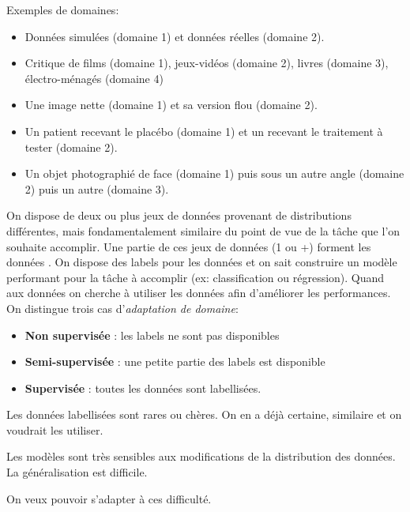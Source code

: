 Exemples de domaines:
\begin{itemize}
	\item Données simulées (domaine 1) et données réelles (domaine 2).
	\item Critique de films (domaine 1), jeux-vidéos (domaine 2), livres (domaine 3), électro-ménagés (domaine 4)
	\item Une image nette (domaine 1) et sa version flou (domaine 2).
	\item Un patient recevant le placébo (domaine 1) et un recevant le traitement à tester (domaine 2).
	\item Un objet photographié de face (domaine 1) puis sous un autre angle (domaine 2) puis un autre (domaine 3).
\end{itemize}

On dispose de deux ou plus jeux de données provenant de distributions différentes, mais fondamentalement
similaire du point de vue de la tâche que l'on souhaite accomplir.
Une partie de ces jeux de données (1 ou +) forment les données \sources{}. 
On dispose des labels pour les données \sources{} et on sait construire un modèle performant 
pour la tâche à accomplir (ex: classification ou régression).
Quand aux données \cibles{} on cherche à utiliser les données \sources{} afin d'améliorer les performances.
On distingue trois cas d'\emph{adaptation de domaine}:
\begin{itemize}
	\item \textbf{Non supervisée} : les labels \cibles{} ne sont pas disponibles
	\item \textbf{Semi-supervisée} : une petite partie des labels \cibles{} est disponible
	\item \textbf{Supervisée} : toutes les données \cibles{} sont labellisées.
\end{itemize}


\TODO
Les données labellisées sont rares ou chères. 
On en a déjà certaine, similaire et on voudrait les utiliser.


\TODO
Les modèles sont très sensibles aux modifications de la distribution des données.
La généralisation est difficile.

\TODO
On veux pouvoir s'adapter à ces difficulté.




